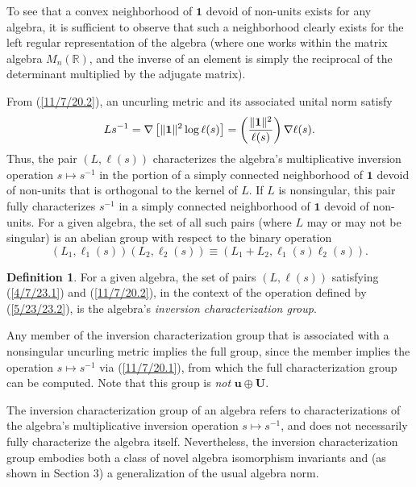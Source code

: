 \documentclass{amsart}
\numberwithin{equation}{section}
\theoremstyle{definition}
\newtheorem{definition}[theorem]{Definition}
\numberwithin{theorem}{section}
\begin{document}
To see that a convex neighborhood of $\mathbf{1}$ devoid of non-units exists for any algebra, it is sufficient to observe that such a neighborhood clearly exists for the left regular representation of the algebra (where one works within the matrix algebra $ M_n(\mathbb{R})$, and the inverse of an element is simply the reciprocal of the determinant multiplied by the adjugate matrix).
  
    From (\ref{11/7/20.2}), an uncurling metric and its associated unital norm satisfy  \begin{equation}\label{11/7/20.1} Ls^{-1}  = \nabla\left[\|{\bf 1}\|^2\log  \ell(s)\right] =   \left(\frac{\|{\bf 1}\|^2}{ \ell(s)}\right)\nabla \ell(s).\end{equation} 
Thus, the pair $(L, \ell(s))$ characterizes the algebra's multiplicative inversion operation $s\mapsto s^{-1}$ in the portion of a simply connected neighborhood of $\mathbf{1}$ devoid of non-units that is orthogonal to the kernel of $L$.  If $L$ is nonsingular, this pair fully characterizes $s^{-1}$ in a simply connected neighborhood of $\mathbf{1}$ devoid of non-units.  For a given algebra, the set of all such pairs (where $L$ may or may not be singular) is an abelian group with respect to the binary operation 
\begin{equation}\label{5/23/23.2} (L_1, \ell_1(s))(L_2, \ell_2(s)) \equiv 
\left(L_1+L_2, \ell_1(s)  \ell_2(s)\right).\end{equation} 
\begin{definition} For a given algebra, the set of pairs $(L, \ell(s))$ satisfying (\ref{4/7/23.1}) and (\ref{11/7/20.2}), in the context of the operation defined by (\ref{5/23/23.2}), is the algebra's {\it inversion characterization group}. \end{definition}

Any member of the inversion characterization group that is associated with a nonsingular uncurling metric implies the full group, since the member implies the operation $s\mapsto s^{-1}$ via (\ref{11/7/20.1}), from which the full characterization group can be computed.  Note that this group is {\it not} $\mathbf{u}\oplus\mathbf{U}$.

The inversion characterization group of an algebra refers to characterizations of the algebra's multiplicative inversion operation $s\mapsto s^{-1}$, and does not necessarily fully characterize the algebra itself.  
Nevertheless,  the inversion characterization group embodies both a class of  novel algebra isomorphism invariants and (as shown in Section 3) a generalization of the usual algebra norm.  
\end{document}
